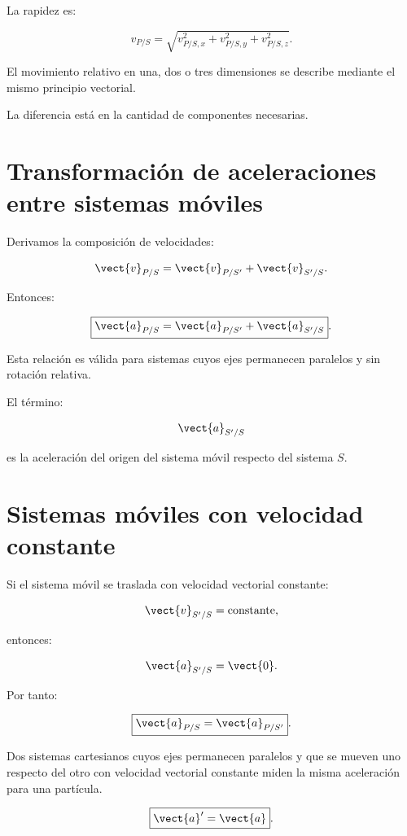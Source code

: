 La rapidez es:

\[
\boxed{
v_{P/S}
=
\sqrt{
v_{P/S,x}^2+
v_{P/S,y}^2+
v_{P/S,z}^2
}
}.
\]

\begin{idea}

El movimiento relativo en una, dos o tres dimensiones
se describe mediante el mismo principio vectorial.

La diferencia está en la cantidad de componentes necesarias.

\end{idea}


\section{Transformación de aceleraciones entre sistemas móviles}

Derivamos la composición de velocidades:

\[
\vect{v}_{P/S}
=
\vect{v}_{P/S'}
+
\vect{v}_{S'/S}.
\]

Entonces:

\[
\boxed{
\vect{a}_{P/S}
=
\vect{a}_{P/S'}
+
\vect{a}_{S'/S}
}.
\]

Esta relación es válida para sistemas cuyos ejes
permanecen paralelos y sin rotación relativa.

El término:

\[
\vect{a}_{S'/S}
\]

es la aceleración del origen del sistema móvil
respecto del sistema \(S\).


\section{Sistemas móviles con velocidad constante}

Si el sistema móvil se traslada con velocidad vectorial
constante:

\[
\vect{v}_{S'/S}=\text{constante},
\]

entonces:

\[
\vect{a}_{S'/S}=\vect{0}.
\]

Por tanto:

\[
\boxed{
\vect{a}_{P/S}=\vect{a}_{P/S'}
}.
\]

\begin{principio}

Dos sistemas cartesianos cuyos ejes permanecen paralelos
y que se mueven uno respecto del otro con velocidad
vectorial constante miden la misma aceleración para
una partícula.

\[
\boxed{
\vect{a}'=\vect{a}
}.
\]

\end{principio}

